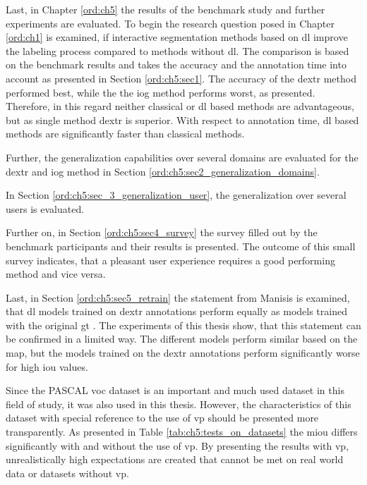 Last, in Chapter \ref{ord:ch5} the results of the benchmark study and further experiments are evaluated.
To begin the research question posed in Chapter \ref{ord:ch1} is examined, if interactive segmentation methods based on \gls{dl} improve the labeling process compared to methods without \gls{dl}.
The comparison is based on the benchmark results and takes the accuracy and the annotation time into account as presented in Section \ref{ord:ch5:sec1}.
The accuracy of the \gls{dextr} method performed best, while the the \gls{iog} method performs worst, as presented.
Therefore, in this regard neither classical or \gls{dl} based methods are advantageous, but as single method \gls{dextr} is superior.
With respect to annotation time, \gls{dl} based methods are significantly faster than classical methods.

Further, the generalization capabilities over several domains are evaluated for the \gls{dextr} and \gls{iog} method in Section \ref{ord:ch5:sec2_generalization_domains}.

In Section \ref{ord:ch5:sec_3_generalization_user}, the generalization over several users is evaluated.

Further on, in Section \ref{ord:ch5:sec4_survey} the survey filled out by the benchmark participants and their results is presented.
The outcome of this small survey indicates, that a pleasant user experience requires a good performing method and vice versa.

Last, in Section \ref{ord:ch5:sec5_retrain} the statement from Manisis \etal is examined, that \gls{dl} models trained on \gls{dextr} annotations perform equally as models trained with the original \gls{gt} \cite{Man18-DEXTR}.
The experiments of this thesis show, that this statement can be confirmed in a limited way.
The different models perform similar based on the \gls{map}, but the models trained on the \gls{dextr} annotations perform significantly worse for high \gls{iou} values. 


Since the PASCAL \gls{voc} dataset \cite{Eve20-PascalVOC} is an important and much used dataset in this field of study, it was also used in this thesis.
However, the characteristics of this dataset with special reference to the use of \gls{vp} should be presented more transparently.
As presented in Table \ref{tab:ch5:tests_on_datasets} the \gls{miou} differs significantly with and without the use of \gls{vp}.
By presenting the results with \gls{vp}, unrealistically high expectations are created that cannot be met on real world data or datasets without \gls{vp}.

